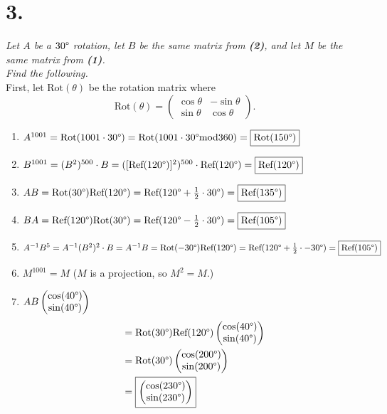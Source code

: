 \documentclass[12pt]{article}
\begin{document}
\section*{3.}
\textit{Let $A$ be a $30 \degree$ rotation, let $B$ be the same matrix
from \textbf{(2)}, and let $M$ be the same matrix from \textbf{(1)}. \\
Find the following.}
\\[\baselineskip]
First, let $\text{Rot}(\theta)$ be the rotation matrix where
\begin{equation*}
	\text{Rot}(\theta) =
	\begin{pmatrix}
		\cos \theta & -\sin \theta \\
		\sin \theta & \cos \theta
	\end{pmatrix}
	.
\end{equation*}
\begin{enumerate}[label=(\alph*)]
	\item $A^{1001} = \text{Rot}(1001 \cdot 30 \degree) =
	\text{Rot}(1001 \cdot 30 \degree \text{mod} 360) =
	\boxed{\text{Rot}(150 \degree)}$
	\item $B^{1001} = (B^2)^{500} \cdot B =
	([\text{Ref}(120 \degree)]^2)^{500} \cdot \text{Ref}(120 \degree) =
	\boxed{\text{Ref}(120 \degree)}$
	\item $AB = \text{Rot}(30 \degree) \text{Ref}(120 \degree) =
	\text{Ref}(120 \degree + \frac{1}{2} \cdot 30 \degree) =
	\boxed{\text{Ref}(135 \degree)}$
	\item $BA = \text{Ref}(120 \degree) \text{Rot}(30 \degree) =
	\text{Ref}(120 \degree - \frac{1}{2} \cdot 30 \degree) =
	\boxed{\text{Ref}(105 \degree)}$
	\item $A^{-1} B^5 = A^{-1} (B^2)^2 \cdot B = A^{-1} B =
	\text{Rot}(-30 \degree) \text{Ref}(120 \degree) = \\
	\text{Ref}(120 \degree + \frac{1}{2} \cdot -30 \degree) =
	\boxed{\text{Ref}(105 \degree)}$
	\item $M^{1001} = \boxed{M}$ \quad ($M$ is a projection, so $M^2 = M$.)
	\item
	$AB \begin{pmatrix} \cos(40 \degree) \\ \sin(40 \degree) \end{pmatrix}$
	\begin{align*}
		&=
		\text{Rot}(30 \degree)
		\text{Ref}(120 \degree)
		\begin{pmatrix} \cos(40 \degree) \\ \sin(40 \degree) \end{pmatrix} \\
		&= 
		\text{Rot}(30 \degree)
		\begin{pmatrix} \cos(200 \degree) \\ \sin(200 \degree) \end{pmatrix}
		\\
		&=
		\boxed{
			\begin{pmatrix}
				\cos(230 \degree) \\ \sin(230 \degree)
			\end{pmatrix}
		}
	\end{align*}
\end{enumerate}
\end{document}
